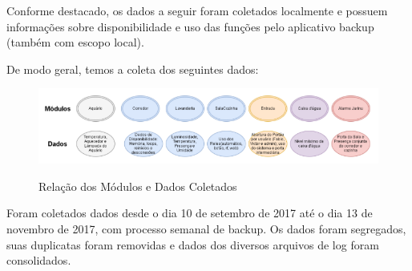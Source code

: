 Conforme destacado, os dados a seguir foram coletados localmente e possuem informações sobre disponibilidade e uso das funções pelo aplicativo backup (também com escopo local).

De modo geral, temos a coleta dos seguintes dados:

\begin{figure}[H]
	\centering
	\caption{Relação dos Módulos e Dados Coletados}
	\includegraphics[width=1.0\textwidth]{DiagramaModulosDados}
	\label{fig:DiagramaModulosDados}
\end{figure}

Foram coletados dados desde o dia 10 de setembro de 2017 até o dia 13 de novembro de 2017, com processo semanal de backup. Os dados foram segregados, suas duplicatas foram removidas e dados dos diversos arquivos de log foram consolidados.

